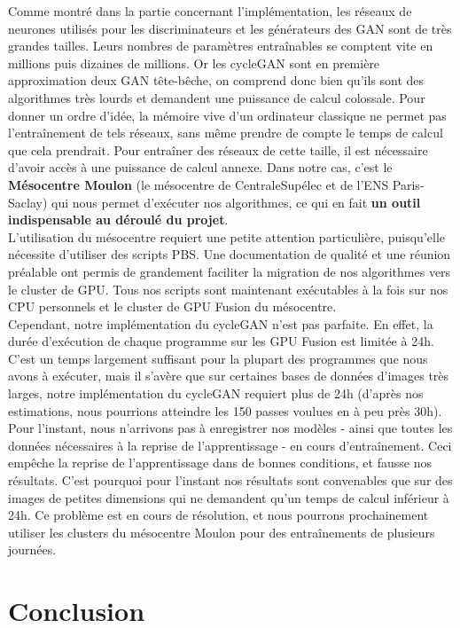 Comme montré dans la partie  concernant l'implémentation, les réseaux de neurones utilisés pour les discriminateurs et les générateurs des GAN sont de très grandes tailles. Leurs nombres de paramètres entraînables se comptent vite en millions puis dizaines de millions. Or les cycleGAN sont en première approximation deux GAN tête-bêche, on comprend donc bien qu'ils sont des algorithmes très lourds et demandent une puissance de calcul colossale. Pour donner un ordre d'idée, la mémoire vive d'un ordinateur classique ne permet pas l’entraînement de tels réseaux, sans même prendre de compte le temps de calcul que cela prendrait. Pour entraîner des réseaux de cette taille, il est nécessaire d'avoir accès à une puissance de calcul annexe. Dans notre cas, c'est le \textbf{Mésocentre Moulon} (le mésocentre de CentraleSupélec et de l'ENS Paris-Saclay)  qui nous permet d’exécuter nos algorithmes, ce qui en fait \textbf{un outil indispensable au déroulé du projet}.\\
L'utilisation du mésocentre requiert une petite attention particulière, puisqu'elle nécessite d'utiliser des scripts PBS. Une documentation de qualité et une réunion préalable ont permis de grandement faciliter la migration de nos algorithmes vers le cluster de GPU. Tous nos scripts sont maintenant exécutables à la fois sur nos CPU personnels et le cluster de GPU Fusion du mésocentre.\\
Cependant, notre implémentation du cycleGAN n'est pas parfaite. En effet, la durée d’exécution de chaque programme sur les GPU Fusion est limitée à 24h. C'est un temps largement suffisant pour la plupart des programmes que nous avons à exécuter, mais il s'avère que sur certaines bases de données d'images très larges, notre implémentation du cycleGAN requiert plus de 24h (d'après nos estimations, nous pourrions atteindre les 150 passes voulues en à peu près 30h). Pour l'instant, nous n'arrivons pas à enregistrer nos modèles - ainsi que toutes les données nécessaires à la reprise de l'apprentissage - en cours d’entraînement. Ceci empêche la reprise de l'apprentissage dans de bonnes conditions, et fausse nos résultats. C'est pourquoi pour l'instant nos résultats sont convenables que sur des images de petites dimensions qui ne demandent qu'un temps de calcul inférieur à 24h. Ce problème est en cours de résolution, et nous pourrons prochainement utiliser les clusters du mésocentre Moulon pour des entraînements de plusieurs journées.



\section{Conclusion}


